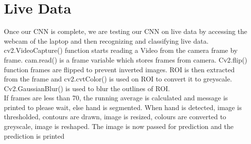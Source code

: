 \section{Live Data}
Once our CNN is complete, we are testing our CNN on live data by accessing the webcam of the laptop and then recognizing and classifying live data.\\
cv2.VideoCapture() function starts reading a Video from the camera frame by frame. cam.read() is a frame variable which stores frames from camera. Cv2.flip() function frames are flipped to prevent inverted images. ROI is then extracted from the frame and cv2.cvtColor() is used on ROI to convert it to greyscale. Cv2.GaussianBlur() is used to blur the outlines of ROI. \\
If frames are less than 70, the running average is calculated and message is printed to please wait, else hand is segmented. When hand is detected, image is thresholded, contours are drawn, image is resized, colours are converted to greyscale, image is reshaped. The image is now passed for prediction and the prediction is printed
